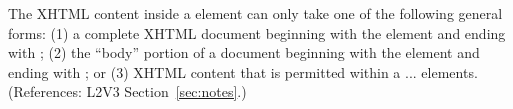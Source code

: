 The XHTML content inside a  element can only take one of the
following general forms: (1) a complete XHTML document beginning with the
element  and ending with ; (2) the ``body''
portion of a document beginning with the element  and ending
with ; or (3) XHTML content that is permitted within a
 ...  elements.  (References: L2V3
Section~\ref{sec:notes}.)
